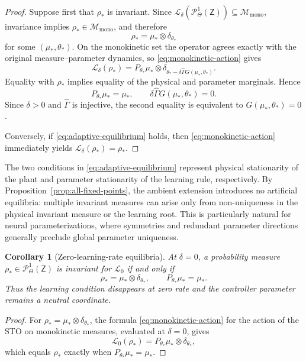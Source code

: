 \documentclass[11pt]{article}
\newtheorem{corollary}[theorem]{Corollary}
\theoremstyle{definition}
\theoremstyle{remark}
\newcommand{\ProbThetaOne}{\mathcal{P}_{\Theta}^{1}}
\newcommand{\STO}{\mathcal{L}}
\newcommand{\Gammahat}{\widehat{\Gamma}}
\newcommand{\Z}{\mathsf{Z}}
\newcommand{\Mmono}{\mathscr{M}_{\mathrm{mono}}}
\begin{document}
\begin{proof}
Suppose first that \(\rho_*\) is invariant.  Since
\(\STO_\delta(\ProbThetaOne(\Z))\subseteq\Mmono\), invariance implies
\(\rho_*\in\Mmono\), and therefore
\[
  \rho_*=\mu_*\otimes\delta_{\theta_*}
\]
for some \((\mu_*,\theta_*)\).  On the monokinetic set the operator agrees
exactly with the original measure--parameter dynamics, so
\eqref{eq:monokinetic-action} gives
\[
  \STO_\delta(\rho_*)
  =P_{\theta_*}\mu_*\otimes
   \delta_{\theta_*-\delta\Gammahat G(\mu_*,\theta_*)}.
\]
Equality with \(\rho_*\) implies equality of the physical and parameter
marginals.  Hence
\[
  P_{\theta_*}\mu_*=\mu_*,
  \qquad
  \delta\Gammahat G(\mu_*,\theta_*)=0.
\]
Since \(\delta>0\) and \(\Gammahat\) is injective, the second equality is
 equivalent to \(G(\mu_*,\theta_*)=0\).

Conversely, if \eqref{eq:adaptive-equilibrium} holds, then
\eqref{eq:monokinetic-action} immediately yields
\(\STO_\delta(\rho_*)=\rho_*\).
\end{proof}



The two conditions in \eqref{eq:adaptive-equilibrium} represent physical stationarity of the plant and parameter stationarity of the learning rule, respectively. By Proposition~\ref{prop:all-fixed-points}, the ambient extension introduces no artificial equilibria: multiple invariant measures can arise only from non-uniqueness in the physical invariant measure or the learning root.
This is particularly natural for neural parameterizations, where symmetries and
redundant parameter directions generally preclude global parameter uniqueness.

\begin{corollary}[Zero-learning-rate equilibria]
\label{cor:zero-rate-fixed-points}
At \(\delta=0\), a probability measure \(\rho_*\in\ProbThetaOne(\Z)\) is invariant for
\(\STO_0\) if and only if
\begin{equation}
  \rho_*=\mu_*\otimes\delta_{\theta_*},
  \qquad
  P_{\theta_*}\mu_*=\mu_*.
  \label{eq:zero-rate-fixed-points}
\end{equation}
Thus the learning condition disappears at zero rate and the controller
parameter remains a neutral coordinate.
\end{corollary}

\begin{proof}

For $\rho_*=\mu_*\otimes\delta_{\theta_*}$, the formula \ref{eq:monokinetic-action}
for the action of the STO on monokinetic measures, evaluated
at $\delta=0$, gives
\[
  \STO_0(\rho_*)
  =P_{\theta_*}\mu_*\otimes\delta_{\theta_*},
\]
which equals \(\rho_*\) exactly when
\(P_{\theta_*}\mu_*=\mu_*\).
\end{proof}
\end{document}
